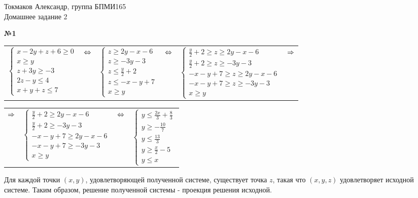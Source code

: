 \documentclass{article}
\newenvironment{task}{\begin{center}\fontsize{14}{14}\selectfont\bf}{\rm\fontsize{12}{12}\selectfont\end{center}}
\begin{document}
	\begin{center}
		Токмаков Александр, группа БПМИ165 \\
		Домашнее задание 2
	\end{center}

	
	\begin{task} 
		№1
	\end{task}
	\begin{center}
	\begin{tabular}{cccccc}
		$\begin{cases}
		x-2y+z+6 \geq 0 \\
		x \geq y \\
		z+3y \geq -3 \\
		2z-y \leq 4 \\
		x+y+z \leq 7
		\end{cases}$ 
		& $\hfill \Leftrightarrow \hfill$ &
		$\begin{cases}
		z \geq 2y-x-6 \\
		z \geq -3y-3 \\
		z \leq \frac{y}{2}+2 \\
		z \leq -x-y+7 \\
		x \geq y 
		\end{cases} $
		& $\hfill \Leftrightarrow \hfill$ &
		$\begin{cases}
		\frac{y}{2}+2 \geq z \geq 2y-x-6 \\
		\frac{y}{2}+2 \geq z \geq -3y-3 \\
		-x-y+7        \geq z \geq 2y-x-6 \\
		-x-y+7        \geq z \geq -3y-3 \\
		x \geq y 
		\end{cases} $
		& $\hfill \Rightarrow \hfill$ 
	\end{tabular}
	\end{center}
	\begin{center}
		\begin{tabular}{cccc}
			$\hfill \Rightarrow \hfill$ &
			$\begin{cases}
			\frac{y}{2}+2 \geq 2y-x-6 \\
			\frac{y}{2}+2 \geq -3y-3 \\
			-x-y+7        \geq 2y-x-6 \\
			-x-y+7         \geq -3y-3 \\
			x \geq y 
			\end{cases} $ 
			& $\hfill \Leftrightarrow \hfill$ &
			$\begin{cases}
			y \leq \frac{2x}{3} + \frac{8}{3} \\
			y \geq -\frac{10}{7} \\
			y \leq \frac{13}{3} \\
			y \geq \frac{x}{2} - 5 \\
			y \leq x
			\end{cases} $
		\end{tabular}
	\end{center}
	Для каждой точки $(x, y)$, удовлетворяющей полученной системе, существует точка $z$, такая что $(x, y, z)$ удовлетворяет исходной системе. Таким образом, решение полученной системы - проекция решения исходной.
\end{document}
